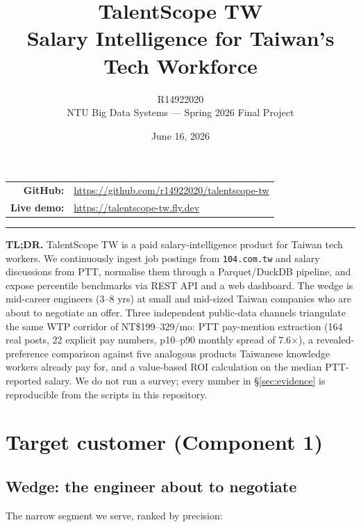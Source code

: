 \documentclass[11pt,a4paper]{article}
\title{\vspace{-1.5em}\textbf{TalentScope TW}\\[0.4em]
\large Salary Intelligence for Taiwan's Tech Workforce}
\author{R14922020 \\[0.2em]
\small NTU Big Data Systems --- Spring 2026 Final Project}
\date{\small June 16, 2026}
\begin{document}
\maketitle
\thispagestyle{fancy}
\vspace{-1em}

\begin{center}\small
\begin{tabular}{rl}
\textbf{GitHub:} & \url{https://github.com/r14922020/talentscope-tw} \\
\textbf{Live demo:} & \url{https://talentscope-tw.fly.dev} \\
\end{tabular}
\end{center}
\vspace{0.5em}

\hrule
\vspace{0.5em}

\noindent
\textbf{TL;DR.} TalentScope TW is a paid salary-intelligence product for
Taiwan tech workers. We continuously ingest job postings from
\texttt{104.com.tw} and salary discussions from PTT, normalise them through
a Parquet/DuckDB pipeline, and expose percentile benchmarks via REST API
and a web dashboard. The wedge is mid-career engineers (3--8 yrs) at small
and mid-sized Taiwan companies who are about to negotiate an offer.
Three independent public-data channels triangulate the same WTP corridor
of \mbox{NT\$199--329/mo}: PTT pay-mention extraction (164 real posts,
22 explicit pay numbers, p10--p90 monthly spread of 7.6$\times$), a
revealed-preference comparison against five analogous products Taiwanese
knowledge workers already pay for, and a value-based ROI calculation on
the median PTT-reported salary. We do not run a survey; every number in
\S\ref{sec:evidence} is reproducible from the scripts in this repository.

\section{Target customer (Component 1)}

\subsection*{Wedge: the engineer about to negotiate}

The narrow segment we serve, ranked by precision:
\end{document}
